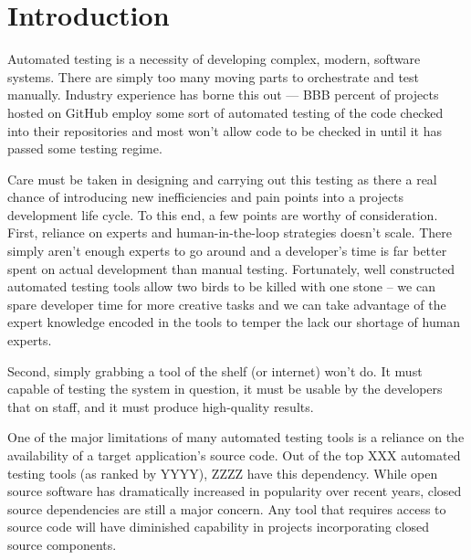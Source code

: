 \section{Introduction}
\label{SEC:introduction}

Automated testing is a necessity of developing complex, modern, software
systems.  There are simply too many moving parts to orchestrate and test
manually.  Industry experience has borne this out --- BBB percent of
projects hosted on GitHub employ some sort of automated testing of the code
checked into their repositories and most won't allow code to be checked in
until it has passed some testing regime.

Care must be taken in designing and carrying out this testing as there a
real chance of introducing new inefficiencies and pain points into a
projects development life cycle.  To this end, a few points are worthy of
consideration. First, reliance on experts and human-in-the-loop strategies
doesn't scale.  There simply aren't enough experts to
go around and a developer's time is far better spent on actual development
than manual testing.  Fortunately, well
constructed automated testing tools allow two birds to be killed with one
stone -- we can spare developer time for more creative tasks and we can
take advantage of the expert knowledge encoded in the tools to temper the
lack our shortage of human experts.


Second, simply grabbing a tool of the shelf (or internet) won't do.  It
must capable of testing the system in question, it must be usable by the
developers that on staff, and it must produce high-quality results.

One of the major limitations of many automated testing tools is a reliance
on the availability of a target application's source code.  Out of the top
XXX automated testing tools (as ranked by YYYY), ZZZZ have this
dependency. While open source software has dramatically
increased in popularity over recent years, closed source dependencies are
still a major concern.  Any tool that requires access to
source code will have diminished capability in projects incorporating
closed source components.


